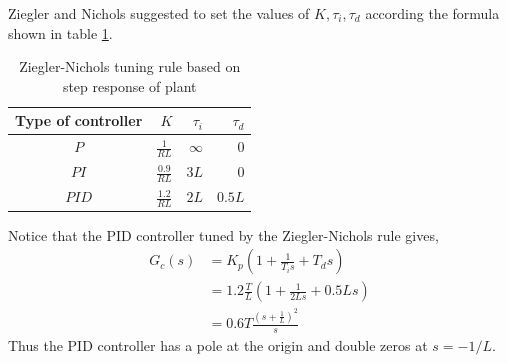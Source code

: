 Ziegler and Nichols suggested to set the values of $K, \tau_i , \tau_d$  according the formula shown in table \ref{table}.
\begin{table}
\begin{center}
\renewcommand{\arraystretch}{1.5}
\begin{tabular}{|c|r|r|r|}\hline
Type of
controller & $K$ & $\tau_i$ & $\tau_d$ \\ \hline
$P$ & $\frac{1}{RL}$ & $\infty$ & 0 \\ \hline
$PI$ & $\frac{0.9}{RL}$ & $3L$ & 0 \\\hline
$PID$ & $\frac{1.2}{RL}$ & $2L$ & $0.5L$ \\ \hline
\end{tabular}
\caption{Ziegler-Nichols tuning rule based on step response of plant}
\label{table}
\end{center}
\end{table}
Notice that the PID controller tuned by the Ziegler-Nichols rule gives,
\begin{align}
G_c(s)&=K_p\left(1+\frac 1{T_is}+T_ds\right)\\
&=1.2\frac {T}{L}\left( 1+\frac 1{2Ls}+0.5Ls\right)\\
&=0.6T\frac{\left(s+\frac 1{L}\right)^2}{s}
\end{align}
Thus the PID controller has a pole at the origin and double zeros at $s= -1/L$.

